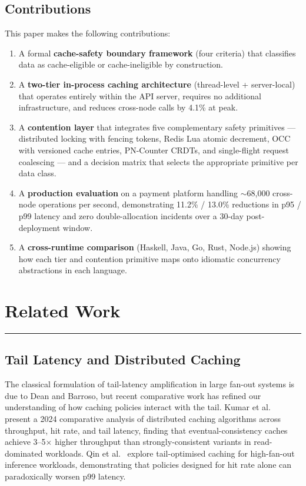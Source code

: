 \documentclass[12pt,a4paper,oneside]{report}
\begin{document}
\section{Contributions}
This paper makes the following contributions:
\begin{enumerate}[leftmargin=*]
    \item A formal \textbf{cache-safety boundary framework} (four criteria) that classifies data as cache-eligible or cache-ineligible by construction.
    \item A \textbf{two-tier in-process caching architecture} (thread-level + server-local) that operates entirely within the API server, requires no additional infrastructure, and reduces cross-node calls by 4.1\% at peak.
    \item A \textbf{contention layer} that integrates five complementary safety primitives --- distributed locking with fencing tokens, Redis Lua atomic decrement, OCC with versioned cache entries, PN-Counter CRDTs, and single-flight request coalescing --- and a decision matrix that selects the appropriate primitive per data class.
    \item A \textbf{production evaluation} on a payment platform handling $\sim$68{,}000 cross-node operations per second, demonstrating 11.2\% / 13.0\% reductions in p95 / p99 latency and zero double-allocation incidents over a 30-day post-deployment window.
    \item A \textbf{cross-runtime comparison} (Haskell, Java, Go, Rust, Node.js) showing how each tier and contention primitive maps onto idiomatic concurrency abstractions in each language.
\end{enumerate}


\chapter{Related Work}
\label{chap:related}
\vspace{-1cm}
\noindent \rule{6.6in}{0.01in}

\section[Tail Latency]{Tail Latency and Distributed Caching}
The classical formulation of tail-latency amplification in large fan-out systems is due to Dean and Barroso, but recent comparative work has refined our understanding of how caching policies interact with the tail. Kumar et al.~\cite{kumar2024caching} present a 2024 comparative analysis of distributed caching algorithms across throughput, hit rate, and tail latency, finding that eventual-consistency caches achieve 3--5$\times$ higher throughput than strongly-consistent variants in read-dominated workloads. Qin et al.~\cite{qin2024tailcache} explore tail-optimised caching for high-fan-out inference workloads, demonstrating that policies designed for hit rate alone can paradoxically worsen p99 latency.
\end{document}
